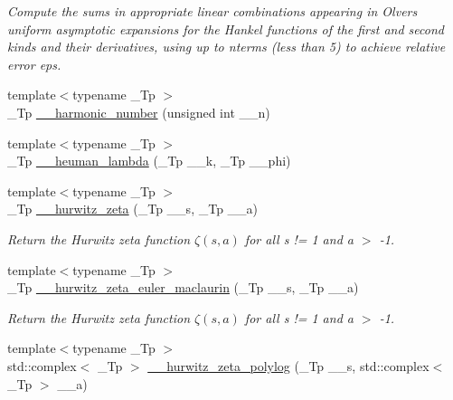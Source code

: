 \begin{DoxyCompactItemize}
\begin{DoxyCompactList}\small\item\em Compute the sums in appropriate linear combinations appearing in Olver\textquotesingle{}s uniform asymptotic expansions for the Hankel functions of the first and second kinds and their derivatives, using up to nterms (less than 5) to achieve relative error {\ttfamily eps}. \end{DoxyCompactList}\item 
{\footnotesize template$<$typename \+\_\+\+Tp $>$ }\\\+\_\+\+Tp \hyperlink{namespacestd_1_1____detail_aeab2857a72e09b180a765bf435f72c2e}{\+\_\+\+\_\+harmonic\+\_\+number} (unsigned int \+\_\+\+\_\+n)
\item 
{\footnotesize template$<$typename \+\_\+\+Tp $>$ }\\\+\_\+\+Tp \hyperlink{namespacestd_1_1____detail_a90938823a16cabc06031ebf209066a94}{\+\_\+\+\_\+heuman\+\_\+lambda} (\+\_\+\+Tp \+\_\+\+\_\+k, \+\_\+\+Tp \+\_\+\+\_\+phi)
\item 
{\footnotesize template$<$typename \+\_\+\+Tp $>$ }\\\+\_\+\+Tp \hyperlink{namespacestd_1_1____detail_a63aafed798ada71b2cc58e84a6652169}{\+\_\+\+\_\+hurwitz\+\_\+zeta} (\+\_\+\+Tp \+\_\+\+\_\+s, \+\_\+\+Tp \+\_\+\+\_\+a)
\begin{DoxyCompactList}\small\item\em Return the Hurwitz zeta function $ \zeta(s,a) $ for all s != 1 and a $>$ -\/1. \end{DoxyCompactList}\item 
{\footnotesize template$<$typename \+\_\+\+Tp $>$ }\\\+\_\+\+Tp \hyperlink{namespacestd_1_1____detail_a56c55858723fe9e0c541f0e77572b58d}{\+\_\+\+\_\+hurwitz\+\_\+zeta\+\_\+euler\+\_\+maclaurin} (\+\_\+\+Tp \+\_\+\+\_\+s, \+\_\+\+Tp \+\_\+\+\_\+a)
\begin{DoxyCompactList}\small\item\em Return the Hurwitz zeta function $ \zeta(s,a) $ for all s != 1 and a $>$ -\/1. \end{DoxyCompactList}\item 
{\footnotesize template$<$typename \+\_\+\+Tp $>$ }\\std\+::complex$<$ \+\_\+\+Tp $>$ \hyperlink{namespacestd_1_1____detail_a7c45415c3ec0e137eea2364a6dd3af4e}{\+\_\+\+\_\+hurwitz\+\_\+zeta\+\_\+polylog} (\+\_\+\+Tp \+\_\+\+\_\+s, std\+::complex$<$ \+\_\+\+Tp $>$ \+\_\+\+\_\+a)
\item 

\end{DoxyCompactItemize}
